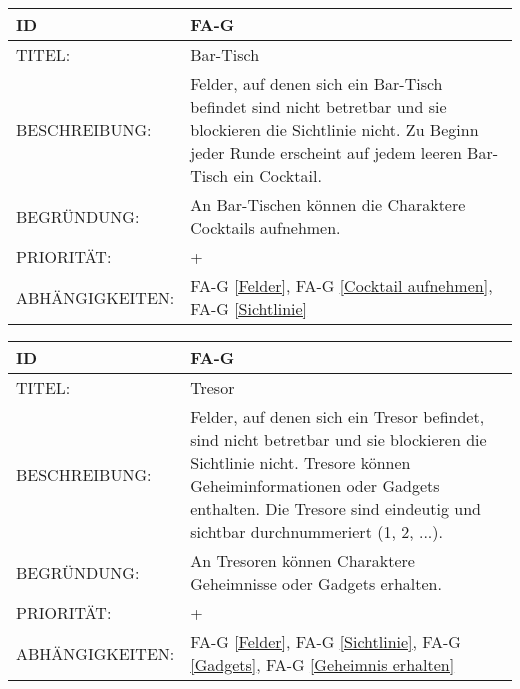 \begin{tabularx}{16cm}{l|X}
	{table}\label{Bar-Tisch}
	\textbf{ID} & \textbf{FA-G \arabic{table}} \\
	\hline
	TITEL: & Bar-Tisch \\
	\hline
	BESCHREIBUNG: & Felder, auf denen sich ein Bar-Tisch befindet sind nicht betretbar und sie blockieren die Sichtlinie nicht. Zu Beginn jeder Runde erscheint auf jedem leeren Bar-Tisch ein Cocktail. \\
	\hline
	BEGRÜNDUNG: & An Bar-Tischen können die Charaktere Cocktails aufnehmen. \\
	\hline
	PRIORITÄT: & +\\
	\hline
	ABHÄNGIGKEITEN: & FA-G \ref{Felder}, FA-G \ref{Cocktail aufnehmen}, FA-G \ref{Sichtlinie} \\
\end{tabularx}

\begin{tabularx}{16cm}{l|X}
	{table}\label{Tresor}
	\textbf{ID} & \textbf{FA-G \arabic{table}} \\
	\hline
	TITEL: & Tresor \\
	\hline
	BESCHREIBUNG: & Felder, auf denen sich ein Tresor befindet, sind nicht betretbar und sie blockieren die Sichtlinie nicht. Tresore können Geheiminformationen oder Gadgets enthalten. Die Tresore sind eindeutig und sichtbar durchnummeriert (1, 2, ...). \\
	\hline
	BEGRÜNDUNG: & An Tresoren können Charaktere Geheimnisse oder Gadgets erhalten. \\
	\hline
	PRIORITÄT: & +\\
	\hline
	ABHÄNGIGKEITEN: & FA-G \ref{Felder}, FA-G \ref{Sichtlinie}, FA-G \ref{Gadgets}, FA-G \ref{Geheimnis erhalten} \\
\end{tabularx}

